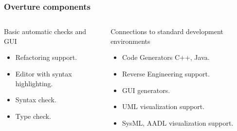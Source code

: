 \begin{frame}
	\frametitle{Overture components}
	\begin{columns}
			\begin{block}{Basic automatic checks and GUI}
				{\scriptsize\begin{itemize}
				  \item Refactoring support.
				  \item Editor with syntax highlighting.
				  \item Syntax check.      
				  \item Type check.
				\end{itemize}}
			\end{block}
			\begin{block}{Connections to standard development environments}
				{\scriptsize\begin{itemize}
			  \item Code Generators C++, Java.
			  \item Reverse Engineering support.
			  \item GUI generators.      
			  \item UML visualization support.
			  \item SysML, AADL visualization support.
				\end{itemize}}
			\end{block}
	\end{columns}
\end{frame}

